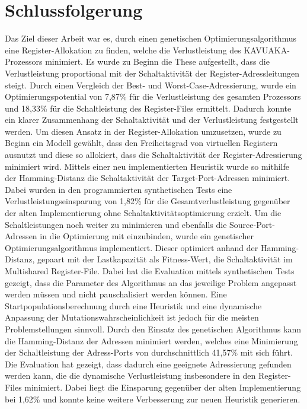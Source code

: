 \chapter{Schlussfolgerung}
\label{chap:schlussfolgerung}
Das Ziel dieser Arbeit war es, durch einen genetischen Optimierungsalgorithmus eine Register-Allokation zu finden, welche die Verlustleistung des KAVUAKA-Prozessors minimiert. Es wurde zu Beginn die These aufgestellt, dass die Verlustleistung proportional mit der Schaltaktivität der Register-Adressleitungen steigt. Durch einen Vergleich der Best- und Worst-Case-Adressierung, wurde ein Optimierungspotential von 7,87\% für die Verlustleistung des gesamten Prozessors und 18,33\% für die Schaltleistung des Register-Files ermittelt. Dadurch konnte ein klarer Zusammenhang der Schaltaktivität und der Verlustleistung festgestellt werden. Um diesen Ansatz in der Register-Allokation umzusetzen, wurde zu Beginn ein Modell gewählt, dass den Freiheitsgrad von virtuellen Registern ausnutzt und diese so allokiert, dass die Schaltaktivität der Register-Adressierung minimiert wird. Mittels einer neu implementierten Heuristik wurde so mithilfe der Hamming-Distanz die Schaltaktivität der Target-Port-Adressen minimiert. Dabei wurden in den programmierten synthetischen Tests eine Verlustleistungseinsparung von 1,82\% für die Gesamtverlustleistung gegenüber der alten Implementierung ohne Schaltaktivitätsoptimierung erzielt.
Um die Schaltleistungen noch weiter zu minimieren und ebenfalls die Source-Port-Adressen in die Optimierung mit einzubinden, wurde ein genetischer Optimierungsalgorithmus implementiert. Dieser optimiert anhand der Hamming-Distanz, gepaart mit der Lastkapazität als Fitness-Wert, die Schaltaktivität im Multishared Register-File. Dabei hat die Evaluation mittels synthetischen Tests gezeigt, dass die Parameter des Algorithmus an das jeweilige Problem angepasst werden müssen und nicht pauschalisiert werden können. Eine Startpopulationsberechnung durch eine Heuristik und eine dynamische Anpassung der Mutationswahrscheinlichkeit ist jedoch für die meisten Problemstellungen sinnvoll.
Durch den Einsatz des genetischen Algorithmus kann die Hamming-Distanz der Adressen minimiert werden, welches eine Minimierung der Schaltleistung der Adress-Ports von durchschnittlich 41,57\% mit sich führt.  
Die Evaluation hat gezeigt, dass dadurch eine geeignete Adressierung gefunden werden kann, die die dynamische Verlustleistung insbesondere in den Register-Files minimiert. Dabei liegt die Einsparung gegenüber der alten Implementierung bei 1,62\% und konnte keine weitere Verbesserung zur neuen Heuristik generieren.
